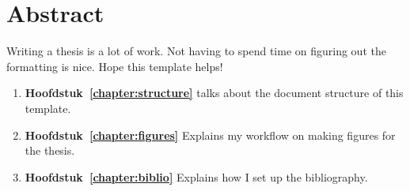 \chapter*{Abstract} \label{chapter:abstract}

Writing a thesis is a lot of work. Not having to spend time on figuring out the formatting is nice. Hope this template helps!

\begin{enumerate}[]
\vfill
\item \textbf{Hoofdstuk~\ref{chapter:structure}} talks about the document structure of this template.
\vfill
\item \textbf{Hoofdstuk~\ref{chapter:figures}} Explains my workflow on making figures for the thesis.
\vfill
\item \textbf{Hoofdstuk~\ref{chapter:biblio}} Explains how I set up the bibliography.
\vfill
\end{enumerate}